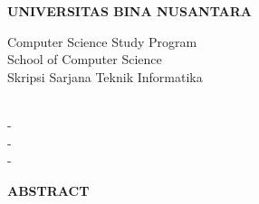 \thispagestyle{plain}

\begin{center}
    \textbf{UNIVERSITAS BINA NUSANTARA}\\
\end{center}

\begin{center}
Computer Science Study Program \\
School of Computer Science \\
Skripsi Sarjana Teknik Informatika \\
\end{center}

\begin{center}
    \bo{{\JudulIndo}} \\
    \vspace*{0.5 cm}
    \penulisSatu - \NIMpenulisSatu \\
    \penulisDua - \NIMpenulisDua \\
    \penulisTiga - \NIMpenulisTiga \\
\end{center}

{\centering\fontsize{16}{19}\selectfont\textbf{ABSTRACT}\par}

